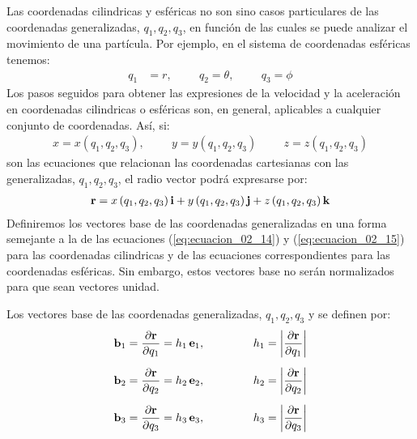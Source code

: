 \documentclass[12pt]{article}
\begin{document}
Las coordenadas cilindricas y esféricas no son sino casos particulares de las coordenadas generalizadas, $q_{1}, q_{2}, q_{3}$, en función de las cuales se puede analizar el movimiento de una partícula. Por ejemplo, en el sistema de coordenadas esféricas tenemos:
\begin{align*}
q_{1} &= r, \hspace{1cm} q_{2} = \theta, \hspace{1cm} q_{3} = \phi
\end{align*}
Los pasos seguidos para obtener las expresiones de la velocidad y la aceleración en coordenadas cilindricas o esféricas son, en general, aplicables a cualquier conjunto de coordenadas. Así, si:
\begin{align}
    x = x \left( q_{1}, q_{2}, q_{3} \right), \hspace{1cm} y = y \left( q_{1}, q_{2}, q_{3} \right) \hspace{1cm} z = z \left( q_{1}, q_{2}, q_{3} \right)  \label{eq:ecuacion_02_53}
\end{align}
son las ecuaciones que relacionan las coordenadas cartesianas con las generalizadas, $q_{1}, q_{2}, q_{3}$, el radio vector podrá expresarse por:
\begin{align}
    \vb{r} = x \left( q_{1}, q_{2}, q_{3} \right) \vb{i} + y \left( q_{1}, q_{2}, q_{3} \right) \vb{j} +  z \left( q_{1}, q_{2}, q_{3} \right) \vb{k}
    \label{eq:ecuacion_02_54}
\end{align}
Definiremos los vectores base de las coordenadas generalizadas en una forma semejante a la de las ecuaciones (\ref{eq:ecuacion_02_14}) y (\ref{eq:ecuacion_02_15}) para las coordenadas cilindricas y de las ecuaciones correspondientes para las coordenadas esféricas. Sin embargo, estos vectores base no serán normalizados para que sean vectores unidad. 
\par
Los vectores base de las coordenadas generalizadas, $q_{1}, q_{2}, q_{3}$ y se definen por:
\begin{align}
    \vb{b}_{1} &= \pdv{\vb{r}}{q_{1}} = h_{1} \, \vb{e}_{1}, \hspace{1.5cm} h_{1} = \abs{\pdv{\vb{r}}{q_{1}}} \label{eq:ecuacion_02_55} \\[0.5em]
    \vb{b}_{2} &= \pdv{\vb{r}}{q_{2}} = h_{2} \, \vb{e}_{2}, \hspace{1.5cm} h_{2} = \abs{\pdv{\vb{r}}{q_{2}}} \label{eq:ecuacion_02_56} \\[0.5em]
    \vb{b}_{3} &= \pdv{\vb{r}}{q_{3}} = h_{3} \, \vb{e}_{3}, \hspace{1.5cm} h_{3} = \abs{\pdv{\vb{r}}{q_{3}}} \label{eq:ecuacion_02_57}
\end{align}
\end{document}

